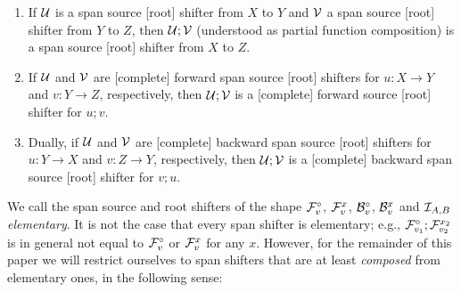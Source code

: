 \begin{fullorname}
\begin{proposition}
\begin{enumerate}[topsep=\smallskipamount]
\item If $\cU$ is a span source [root] shifter from $X$ to $Y$ and $\cV$ a span source [root] shifter from $Y$ to $Z$, then $\cU;\cV$ (understood as partial function composition) is a span source [root] shifter from $X$ to $Z$. 
\item If $\cU$ and $\cV$ are [complete] forward span source [root] shifters for $u: X\to Y$ and $v: Y \to Z$, respectively, then $\cU;\cV$ is a [complete] forward source [root] shifter for $u;v$.
\item Dually, if $\cU$ and $\cV$ are [complete] backward span source [root] shifters for $u: Y\to X$ and $v: Z \to Y$, respectively, then $\cU;\cV$ is a [complete] backward span source [root] shifter for $v;u$.
\end{enumerate}
\end{proposition}
\end{fullorname}
%
\begin{comment}
\medskip\noindent
In fact we also need the following auxiliary composition property for direct span shifters.\todo{AR: Added AC: ok} This immediately follows from the associativity of span composition combined with the fact that spans with identity left-legs and identity right-legs compose; we omit the proof.

\begin{lemma}[direct span shifters compose]\llabel{direct sb-shifters compose}
Let $t:A\to B,v:B\to C$ be arrows; then
\begin{enumerate*}[topsep=\smallskipamount]
\item $\dF t;\dF v=\dF{t;v}$, and 
\item $\dB v;\dB t=\dB{t;v}$.
\end{enumerate*}
\end{lemma}
\end{comment}
%
We call the span source and root shifters of the shape $\dF v$, $\rF v x$, $\dB v$, $\rB v x$ and $\cI_{A,B}$ \emph{elementary}. It is not the case that every span shifter is elementary; e.g., $\dF{v_1};\rF{v_2}{x_2}$ is in general not equal to $\dF v$ or $\rF v x$ for any $x$. However, for the remainder of this paper we will restrict ourselves to span shifters that are at least \emph{composed} from elementary ones, in the following sense:

